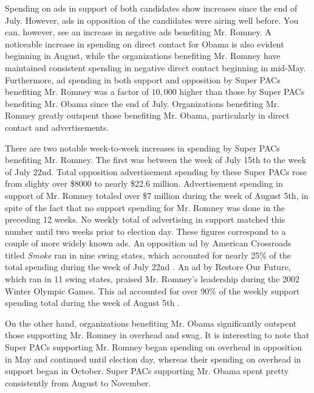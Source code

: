\documentclass[11pt]{article}\usepackage{graphicx, color}
\begin{document}
Spending on ads in support of both candidates show increases since the end of July. However, ads in opposition of the candidates were airing well before. You can, however, see an increase in negative ads benefiting Mr. Romney. A noticeable increase in spending on direct contact for Obama is also evident beginning in August, while the organizations benefiting Mr. Romney have maintained consistent spending in negative direct contact beginning in mid-May. Furthermore, ad spending in both support and opposition by Super PACs benefiting Mr. Romney was a factor of $10,000$ higher than those by Super PACs benefiting Mr. Obama since the end of July. Organizations benefiting Mr. Romney greatly outspent those benefiting Mr. Obama, particularly in direct contact and advertisements.

There are two notable week-to-week increases in spending by Super PACs benefiting Mr. Romney. The first was between the week of July 15th to the week of July 22nd. Total opposition advertisement spending by these Super PACs rose from slighty over \$8000 to nearly \$22.6 million. Advertisement spending in support of Mr. Romney totaled over \$7 million during the week of August 5th, in spite of the fact that no support spending for Mr. Romney was done in the preceding 12 weeks. No weekly total of advertising in support matched this number until two weeks prior to election day. These figures correspond to a couple of more widely known ads. An opposition ad by American Crossroads titled \textit{Smoke} ran in nine swing states, which accounted for nearly 25\% of the total spending during the week of July 22nd \cite{kw-crossroads}. An ad by Restore Our Future, which ran in 11 swing states, praised Mr. Romney's leadership during the 2002 Winter Olympic Games. This ad accounted for over 90\% of the weekly support spending total during the week of August 5th \cite{ap-restore}.

On the other hand, organizations benefiting Mr. Obama significantly outspent those supporting Mr. Romney in overhead and swag. It is interesting to note that Super PACs supporting Mr. Romney began spending on overhead in opposition in May and continued until election day, whereas their spending on overhead in support began in October. Super PACs supporting Mr. Obama spent pretty consistently from August to November.
\end{document}
